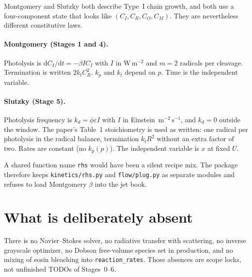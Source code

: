 Montgomery and Slutzky both describe Type~I chain growth, and both use a four-component state that looks like $(C_I,C_R,C_O,C_M)$.
They are nevertheless different constitutive laws.

\paragraph{Montgomery (Stages 1 and 4).}
Photolysis is $\mathrm{d}C_I/\mathrm{d}t=-\beta I C_I$ with $I$ in $\mathrm{W\,m^{-2}}$ and $m=2$ radicals per cleavage.
Termination is written $2k_t C_R^2$.
$k_p$ and $k_t$ depend on $p$.
Time is the independent variable.

\paragraph{Slutzky (Stage 5).}
Photolysis frequency is $k_d=\phi\varepsilon I$ with $I$ in Einstein~$\mathrm{m^{-2}\,s^{-1}}$, and $k_d=0$ outside the window.
The paper's Table~1 stoichiometry is used as written: one radical per photolysis in the radical balance, termination $k_t R^2$ without an extra factor of two.
Rates are constant (no $k_p(p)$).
The independent variable is $x$ at fixed $U$.

A shared function name \texttt{rhs} would have been a silent recipe mix.
The package therefore keeps \texttt{kinetics/rhs.py} and \texttt{flow/plug.py} as separate modules and refuses to load Montgomery $\beta$ into the jet book.

\section{What is deliberately absent}

There is no Navier--Stokes solver, no radiative transfer with scattering, no inverse grayscale optimizer, no Dobson free-volume species set in production, and no mixing of eosin bleaching into \texttt{reaction\_rates}.
Those absences are scope locks, not unfinished TODOs of Stages~0--6.

